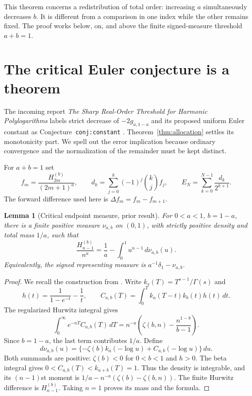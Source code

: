 \documentclass[11pt,a4paper]{article}
\numberwithin{equation}{section}
\newtheorem{lemma}[theorem]{Lemma}
\theoremstyle{definition}
\theoremstyle{remark}
\begin{document}
This theorem concerns a redistribution of total order: increasing $a$
simultaneously decreases $b$. It is different from a comparison in one
index while the other remains fixed. The proof works below, on, and
above the finite signed-measure threshold $a+b=1$.

\section{The critical Euler conjecture is a theorem}
\label{sec:critical}

The incoming report \emph{The Sharp Real-Order Threshold for Harmonic
Polylogarithms} labels strict decrease of $-2g_{a,1-a}$ and its proposed
uniform Euler constant as Conjecture~\texttt{conj:constant}
\cite{realorder}. Theorem~\ref{thm:allocation} settles its monotonicity
part. We spell out the error implication because ordinary convergence
and the normalization of the remainder must be kept distinct.

For $a+b=1$ set
\begin{equation}\label{eq:eulerdef}
 f_m=\frac{H_{2m}^{(b)}}{(2m+1)^a},\qquad
 d_k=\sum_{j=0}^k(-1)^j\binom kj f_j,
 \qquad E_N=\sum_{k=0}^{N-1}\frac{d_k}{2^{k+1}}.
\end{equation}
The forward difference used here is $\Delta f_m=f_m-f_{m+1}$.

\begin{lemma}[Critical endpoint measure, prior result]\label{lem:criticalmeasure}
For $0<a<1$, $b=1-a$, there is a finite positive measure $\nu_{a,b}$
on $(0,1)$, with strictly positive density and total mass $1/a$, such that
\begin{equation}\label{eq:criticalmom}
 \frac{H_{n-1}^{(b)}}{n^a}
   =\frac1a-\int_0^1u^{n-1}\,d\nu_{a,b}(u).
\end{equation}
Equivalently, the signed representing measure is
$a^{-1}\delta_1-\nu_{a,b}$.
\end{lemma}
\begin{proof}
We recall the construction from \cite{realorder}. Write
$k_s(T)=T^{s-1}/\Gamma(s)$ and
\[
 h(t)=\frac1{1-e^{-t}}-\frac1t,\qquad
 C_{a,b}(T)=\int_0^T k_a(T-t)k_b(t)h(t)\,dt.
\]
The regularized Hurwitz integral \cite{dlmf-hurwitz} gives
\[
 \int_0^\infty e^{-nT}C_{a,b}(T)\,dT
 =n^{-a}\left(\zeta(b,n)-\frac{n^{1-b}}{b-1}\right).
\]
Since $b=1-a$, the last term contributes $1/a$. Define
\[
 d\nu_{a,b}(u)
 =\{-\zeta(b)k_a(-\log u)+C_{a,b}(-\log u)\}\,du.
\]
Both summands are positive: $\zeta(b)<0$ for $0<b<1$ and $h>0$.
The beta integral gives $0<C_{a,b}(T)<k_{a+b}(T)=1$.
Thus the density is integrable, and its $(n-1)$st moment is
$1/a-n^{-a}(\zeta(b)-\zeta(b,n))$. The finite Hurwitz difference is
$H_{n-1}^{(b)}$. Taking $n=1$ proves its mass and the formula.
\end{proof}
\end{document}
